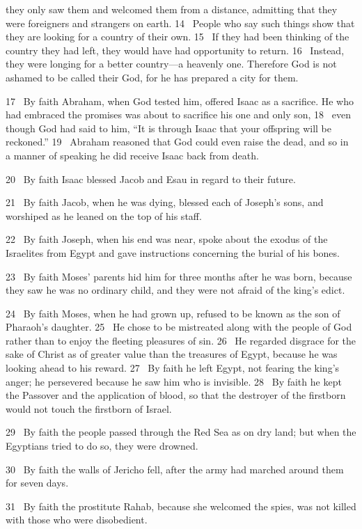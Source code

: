 they only saw them and welcomed them from a distance,
admitting that they were foreigners and strangers on earth.
14 
People who say such things show that they are looking for a country of their own.
15 
If they had been thinking of the country they had left, they would have had opportunity to return.
16 
Instead, they were longing for a better country—a heavenly one.
Therefore God is not ashamed
to be called their God,
for he has prepared a city
for them.
\par
17 
By faith Abraham, when God tested him, offered Isaac as a sacrifice.
He who had embraced the promises was about to sacrifice his one and only son,
18 
even though God had said to him, “It is through Isaac that your offspring will be reckoned.”
19 
Abraham reasoned that God could even raise the dead,
and so in a manner of speaking he did receive Isaac back from death.
\par
20 
By faith Isaac blessed Jacob and Esau in regard to their future.
\par
21 
By faith Jacob, when he was dying, blessed each of Joseph’s sons,
and worshiped as he leaned on the top of his staff.
\par
22 
By faith Joseph, when his end was near, spoke about the exodus of the Israelites from Egypt and gave instructions concerning the burial of his bones.
\par
23 
By faith Moses’ parents hid him for three months after he was born,
because they saw he was no ordinary child, and they were not afraid of the king’s edict.
\par
24 
By faith Moses, when he had grown up, refused to be known as the son of Pharaoh’s daughter.
25 
He chose to be mistreated
along with the people of God rather than to enjoy the fleeting pleasures of sin.
26 
He regarded disgrace
for the sake of Christ
as of greater value than the treasures of Egypt, because he was looking ahead to his reward.
27 
By faith he left Egypt,
not fearing the king’s anger; he persevered because he saw him who is invisible.
28 
By faith he kept the Passover and the application of blood, so that the destroyer
of the firstborn would not touch the firstborn of Israel.
\par
29 
By faith the people passed through the Red Sea as on dry land; but when the Egyptians tried to do so, they were drowned.
\par
30 
By faith the walls of Jericho fell, after the army had marched around them for seven days.
\par
31 
By faith the prostitute Rahab, because she welcomed the spies, was not killed with those who were disobedient.
